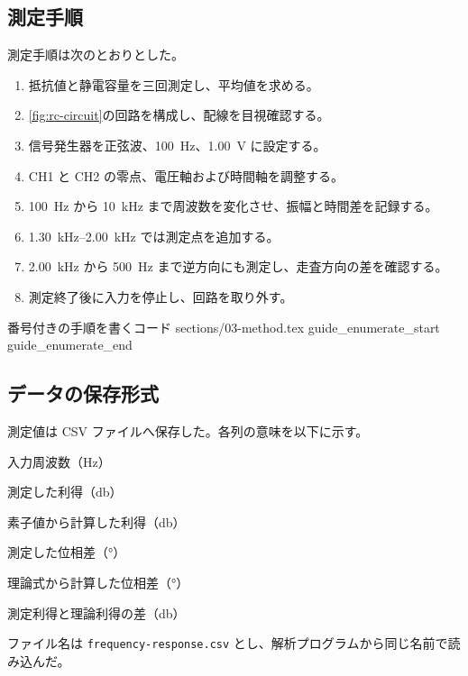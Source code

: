
\subsection{測定手順}
\label{subsec:procedure}

測定手順は次のとおりとした。
\begin{enumerate}[label=(\arabic*),leftmargin=3em,itemsep=0.25em]
  \item 抵抗値と静電容量を三回測定し、平均値を求める。
  \item \cref{fig:rc-circuit}の回路を構成し、配線を目視確認する。
  \item 信号発生器を正弦波、\qty{100}{\hertz}、\qty{1.00}{\volt} に設定する。
  \item CH1 と CH2 の零点、電圧軸および時間軸を調整する。
  \item \qty{100}{\hertz} から \qty{10}{\kilo\hertz} まで周波数を変化させ、振幅と時間差を記録する。
  \item \qtyrange{1.30}{2.00}{\kilo\hertz} では測定点を追加する。
  \item \qty{2.00}{\kilo\hertz} から \qty{500}{\hertz} まで逆方向にも測定し、走査方向の差を確認する。
  \item 測定終了後に入力を停止し、回路を取り外す。
\end{enumerate}

\SampleGuideSource
  {番号付きの手順を書くコード}
  {sections/03-method.tex}
  {guide_enumerate_start}
  {guide_enumerate_end}


\subsection{データの保存形式}
\label{subsec:data-format}

測定値は CSV ファイルへ保存した。各列の意味を以下に示す。

\begin{description}[leftmargin=12em,labelwidth=10.5em,nosep]
  \item[\texttt{frequency\_hz}] 入力周波数（\unit{\hertz}）
  \item[\texttt{gain\_measured}] 測定した利得（\unit{\decibel}）
  \item[\texttt{gain\_theory}] 素子値から計算した利得（\unit{\decibel}）
  \item[\texttt{phase\_measured}] 測定した位相差（\unit{\degree}）
  \item[\texttt{phase\_theory}] 理論式から計算した位相差（\unit{\degree}）
  \item[\texttt{residual\_db}] 測定利得と理論利得の差（\unit{\decibel}）
\end{description}

ファイル名は \lstinline|frequency-response.csv| とし、解析プログラムから同じ名前で読み込んだ。

